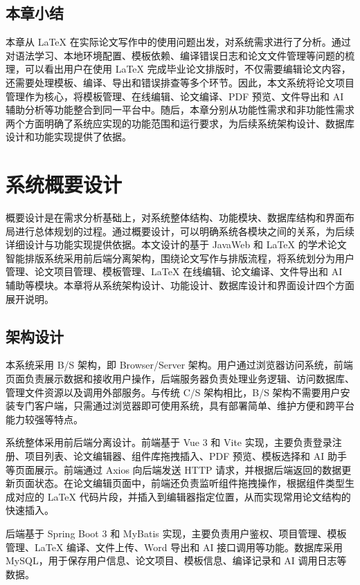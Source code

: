 \documentclass{xduugthesis}
\begin{document}
\section{本章小结}
本章从 LaTeX 在实际论文写作中的使用问题出发，对系统需求进行了分析。通过对语法学习、本地环境配置、模板依赖、编译错误日志和论文文件管理等问题的梳理，可以看出用户在使用 LaTeX 完成毕业论文排版时，不仅需要编辑论文内容，还需要处理模板、编译、导出和错误排查等多个环节。因此，本文系统将论文项目管理作为核心，将模板管理、在线编辑、论文编译、PDF 预览、文件导出和 AI 辅助分析等功能整合到同一平台中。随后，本章分别从功能性需求和非功能性需求两个方面明确了系统应实现的功能范围和运行要求，为后续系统架构设计、数据库设计和功能实现提供了依据。

\chapter{系统概要设计}
概要设计是在需求分析基础上，对系统整体结构、功能模块、数据库结构和界面布局进行总体规划的过程。通过概要设计，可以明确系统各模块之间的关系，为后续详细设计与功能实现提供依据。本文设计的基于 JavaWeb 和 LaTeX 的学术论文智能排版系统采用前后端分离架构，围绕论文写作与排版流程，将系统划分为用户管理、论文项目管理、模板管理、LaTeX 在线编辑、论文编译、文件导出和 AI 辅助等模块。本章将从系统架构设计、功能设计、数据库设计和界面设计四个方面展开说明。

\section{架构设计}
本系统采用 B/S 架构，即 Browser/Server 架构。用户通过浏览器访问系统，前端页面负责展示数据和接收用户操作，后端服务器负责处理业务逻辑、访问数据库、管理文件资源以及调用外部服务。与传统 C/S 架构相比，B/S 架构不需要用户安装专门客户端，只需通过浏览器即可使用系统，具有部署简单、维护方便和跨平台能力较强等特点。

系统整体采用前后端分离设计。前端基于 Vue 3 和 Vite 实现，主要负责登录注册、项目列表、论文编辑器、组件库拖拽插入、PDF 预览、模板选择和 AI 助手等页面展示。前端通过 Axios 向后端发送 HTTP 请求，并根据后端返回的数据更新页面状态。在论文编辑页面中，前端还负责监听组件拖拽操作，根据组件类型生成对应的 LaTeX 代码片段，并插入到编辑器指定位置，从而实现常用论文结构的快速插入。

后端基于 Spring Boot 3 和 MyBatis 实现，主要负责用户鉴权、项目管理、模板管理、LaTeX 编译、文件上传、Word 导出和 AI 接口调用等功能。数据库采用 MySQL，用于保存用户信息、论文项目、模板信息、编译记录和 AI 调用日志等数据。
\end{document}
